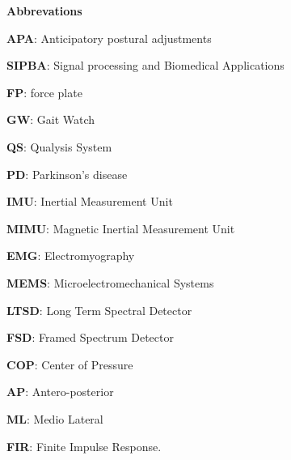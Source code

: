 
\begin{titlepage}
\label{ch:abbrevations}
{ \huge \bfseries Abbrevations \\[0.4cm] }

\textbf{APA}: Anticipatory postural adjustments

\textbf{SIPBA}: Signal processing and Biomedical Applications

\textbf{FP}: force plate

\textbf{GW}: Gait Watch

\textbf{QS}: Qualysis System

\textbf{PD}: Parkinson’s disease

\textbf{IMU}: Inertial Measurement Unit

\textbf{MIMU}: Magnetic Inertial Measurement Unit

\textbf{EMG}: Electromyography

\textbf{MEMS}: Microelectromechanical Systems

\textbf{LTSD}: Long Term Spectral Detector

\textbf{FSD}: Framed Spectrum Detector

\textbf{COP}: Center of Pressure

\textbf{AP}: Antero-posterior

\textbf{ML}: Medio Lateral

\textbf{FIR}: Finite Impulse Response.


\end{titlepage} 